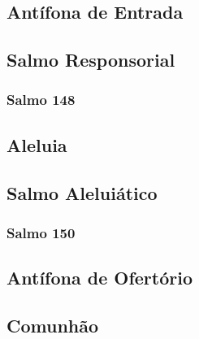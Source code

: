 \subsection{Antífona de Entrada}\label{subsection:tempus-per-annum/sanctissimae-trinitatis/introitus}

\AllowPageFlush

\subsection[Salmo Responsorial]{Salmo Responsorial}\label{subsection:tempus-per-annum/sanctissimae-trinitatis/psalmus-responsorius}
\subsubsection{Salmo 148}

\AllowPageFlush

\subsection{Aleluia}\label{subsection:tempus-per-annum/sanctissimae-trinitatis/alleluia}

\AllowPageFlush

\subsection[Salmo Aleluiático]{Salmo Aleluiático}\label{subsection:tempus-per-annum/sanctissimae-trinitatis/psalmus-alleluiaticus}
\subsubsection{Salmo 150}

\AllowPageFlush

\subsection{Antífona de Ofertório}\label{subsection:tempus-per-annum/sanctissimae-trinitatis/offertorium}

\AllowPageFlush

\subsection{Comunhão}\label{subsection:tempus-per-annum/sanctissimae-trinitatis/communio}
